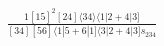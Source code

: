 \documentclass[varwidth, border=5pt]{standalone}
\begin{document}
\begin{my}
$\begin{gathered}
\scriptscriptstyle\frac{1[15]^2[24]⟨34⟩⟨1|2+4|3]}{[34][56]⟨1|5+6|1]⟨3|2+4|3]s_{234}}
\end{gathered}$
\end{my}
\end{document}
